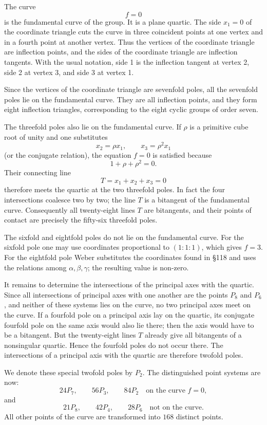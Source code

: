 \documentclass[11pt,a4paper]{book}
\begin{document}
The curve
\[
 f=0
\]
is the fundamental curve of the group.  It is a plane quartic.  The side \(x_1=0\) of the coordinate triangle cuts the curve in three coincident points at one vertex and in a fourth point at another vertex.  Thus the vertices of the coordinate triangle are inflection points, and the sides of the coordinate triangle are inflection tangents.  With the usual notation, side 1 is the inflection tangent at vertex 2, side 2 at vertex 3, and side 3 at vertex 1.

Since the vertices of the coordinate triangle are sevenfold poles, all the sevenfold poles lie on the fundamental curve.  They are all inflection points, and they form eight inflection triangles, corresponding to the eight cyclic groups of order seven.

The threefold poles also lie on the fundamental curve.  If \(\rho\) is a primitive cube root of unity and one substitutes
\[
 x_2=\rho x_1,
\qquad x_3=\rho^2x_1
\]
(or the conjugate relation), the equation \(f=0\) is satisfied because
\[
 1+\rho+\rho^2=0.
\]
Their connecting line
\[
 T=x_1+x_2+x_3=0
\]
therefore meets the quartic at the two threefold poles.  In fact the four intersections coalesce two by two; the line \(T\) is a bitangent of the fundamental curve.  Consequently all twenty-eight lines \(T\) are bitangents, and their points of contact are precisely the fifty-six threefold poles.

The sixfold and eightfold poles do not lie on the fundamental curve.  For the sixfold pole one may use coordinates proportional to \((1:1:1)\), which gives \(f=3\).  For the eightfold pole Weber substitutes the coordinates found in \S 118 and uses the relations among \(\alpha,\beta,\gamma\); the resulting value is non-zero.

It remains to determine the intersections of the principal axes with the quartic.  Since all intersections of principal axes with one another are the points \(P_8\) and \(P_6\), and neither of these systems lies on the curve, no two principal axes meet on the curve.  If a fourfold pole on a principal axis lay on the quartic, its conjugate fourfold pole on the same axis would also lie there; then the axis would have to be a bitangent.  But the twenty-eight lines \(T\) already give all bitangents of a nonsingular quartic.  Hence the fourfold poles do not occur there.  The intersections of a principal axis with the quartic are therefore twofold poles.

We denote these special twofold poles by \(P_2\).  The distinguished point systems are now:
\[
24P_7,
\qquad 56P_3,
\qquad 84P_2
\quad\text{on the curve }f=0,
\]
and
\[
21P_8,
\qquad 42P_4,
\qquad 28P_6
\quad\text{not on the curve.}
\]
All other points of the curve are transformed into \(168\) distinct points.
\end{document}
